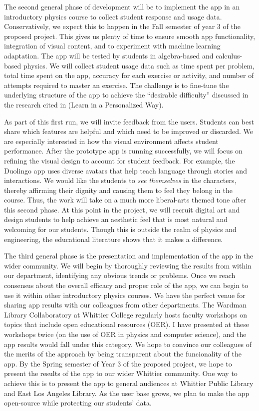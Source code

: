 \documentclass[10pt]{amsart}
\theoremstyle{definition}
\numberwithin{equation}{section}
\begin{document}
The second general phase of development will be to implement the app in an introductory physics course to collect student response and usage data.  Conservatively, we expect this to happen in the Fall semester of year 3 of the proposed project.  This gives us plenty of time to ensure smooth app functionality, integration of visual content, and to experiment with machine learning adaptation.  The app will be tested by students in algebra-based and calculus-based physics.  We will collect student usage data such as time spent per problem, total time spent on the app, accuracy for each exercise or activity, and number of attempts required to master an exercise.  The challenge is to fine-tune the underlying structure of the app to achieve the ``desirable difficulty'' discussed in the research cited in \cite{duolingo_whitepaper} (Learn in a Personalized Way).  

As part of this first run, we will invite feedback from the users.  Students can best share which features are helpful and which need to be improved or discarded.  We are especially interested in how the visual environment affects student performance.  After the prototype app is running successfully, we will focus on refining the visual design to account for student feedback.  For example, the Duolingo app uses diverse avatars that help teach language through stories and interactions.  We would like the students to \textit{see themselves} in the characters, thereby affirming their dignity and causing them to feel they belong in the course.  Thus, the work will take on a much more liberal-arts themed tone after this second phase.  At this point in the project, we will recruit digital art and design students to help achieve an aesthetic feel that is most natural and welcoming for our students.  Though this is outside the realm of physics and engineering, the educational literature shows that it makes a difference. 

The third general phase is the presentation and implementation of the app in the wider community.  We will begin by thoroughly reviewing the results from within our department, identifying any obvious trends or problems.  Once we reach consensus about the overall efficacy and proper role of the app, we can begin to use it within other introductory physics courses.  We have the perfect venue for sharing app results with our colleagues from other departments.  The Wardman Library Collaboratory at Whittier College regularly hosts faculty workshops on topics that include open educational resources (OER).  I have presented at these workshops twice (on the use of OER in physics and computer science), and the app results would fall under this category.  We hope to convince our colleagues of the merits of the approach by being transparent about the funcionality of the app.  By the Spring semester of Year 3 of the proposed project, we hope to present the results of the app to our wider Whittier community.  One way to achieve this is to present the app to general audiences at Whittier Public Library and East Los Angeles Library.  As the user base grows, we plan to make the app open-source while protecting our students' data.
\end{document}
